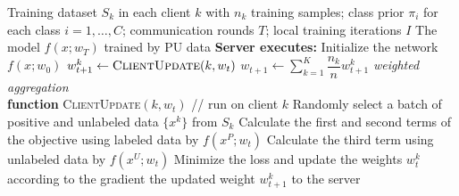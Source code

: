 \documentclass{article}
\begin{document}
\begin{algorithm}[!h]
\renewcommand{\algorithmicrequire}{\textbf{Input:}} %
\renewcommand{\algorithmicensure}{\textbf{Output:}} %
	\caption{FedPU (federated learning with positive and unlabeled data)} %
	\begin{algorithmic}[1] %
	    \REQUIRE
	    Training dataset $S_{k}$ in each client $k$ with $n_{k}$ training samples;
	    class prior $\pi_{i}$ for each class $i=1,\dots,C$;
	    communication rounds $T$; local training iterations $I$
	    \ENSURE
	    The model $f(x;w_{T})$ trained by PU data
	    \STATE \textbf{Server executes:}
	    \STATE Initialize the network $f(x;w_{0})$
	    \STATE $w_{t+1}^{k}\leftarrow \textsc{ClientUpdate}(k,w_{t})$
	    \ENDFOR
	    \STATE $w_{t+1}\leftarrow \sum_{k=1}^{K}\dfrac{n_{k}}{n}w_{t+1}^{k}$
	    \hfill \emph{weighted aggregation} %
	    \ENDFOR
	    \\\hrulefill
	    \STATE \textbf{function} \textsc{ClientUpdate}$(k,w_{t})$ \quad // run on client $k$
	    \STATE Randomly select a batch of positive and unlabeled data $\{x^{k}\}$ from $S_{k}$
	    \STATE Calculate the first and second terms of the objective using labeled data
	    by $f(x^{P};w_{t})$
	    \STATE Calculate the third term using unlabeled data by $f(x^{U};w_{t})$ %
	    \STATE Minimize the loss and update the weights $w_{t}^{k}$ according to the gradient
	    \ENDFOR
	    \RETURN the updated weight $w_{t+1}^{k}$ to the server
	\end{algorithmic}
\end{algorithm}
\end{document}
